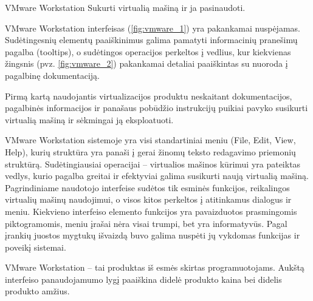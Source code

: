\begin{xcase}{VMware Workstation}
  \xcgoal
  {
    Sukurti virtualią mašiną ir ja pasinaudoti.
  }
  
  \xctools
  {
    VMware Workstation interfeisas (\ref{fig:vmware_1}) yra pakankamai nuspėjamas. Sudėtingesnių elementų 
    paaiškinimus galima pamatyti informacinių pranešimų pagalba (tooltips), o sudėtingos
    operacijos perkeltos į vedlius, kur kiekvienas žingsnis (pvz. \ref{fig:vmware_2}) pakankamai detaliai 
    paaiškintas su nuoroda į pagalbinę dokumentaciją.
  }
  
  \xcresult
  {
    Pirmą kartą naudojantis virtualizacijos produktu neskaitant dokumentacijos, pagalbinės
    informacijos ir panašaus pobūdžio instrukcijų puikiai pavyko susikurti virtualią mašiną
    ir sėkmingai ją eksploatuoti.
  }
  
  \xcprinciples
  {
    {
      VMware Workstation sistemoje yra visi standartiniai meniu (File, Edit, View, Help), kurių
      struktūra yra panaši į gerai žinomų teksto redagavimo priemonių struktūrą.
    }
    {
      Sudėtingiausiai operacijai – virtualios mašinos kūrimui yra pateiktas vedlys, kurio
      pagalba greitai ir efektyviai galima susikurti naują virtualią mašiną.
    }
    {
      Pagrindiniame naudotojo interfeise sudėtos tik esminės funkcijos, reikalingos virtualių
      mašinų naudojimui, o visos kitos perkeltos į atitinkamus dialogus ir meniu.
    }
    {
      Kiekvieno interfeiso elemento funkcijos yra pavaizduotos prasmingomis piktogramomis, meniu
      įrašai nėra visai trumpi, bet yra informatyvūs.
    }
    {
      Pagal įrankių juostos mygtukų išvaizdą buvo galima nuspėti jų vykdomas funkcijas ir 
      poveikį sistemai.
    }
  }
  
  \xcthoughts
  {
    VMware Workstation – tai produktas iš esmės skirtas programuotojams. Aukštą interfeiso
    panaudojamumo lygį paaiškina didelė produkto kaina bei didelis produkto amžius.
  }
\end{xcase}
